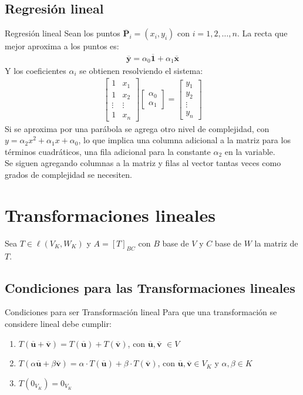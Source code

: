 \documentclass[a4paper, twoside]{article}
\numberwithin{equation}{section}
\numberwithin{figure}{section}
\numberwithin{table}{section}
\newcommand{\vect}[1]{\overline{\textbf{#1}}}
\begin{document}
\subsection{Regresión lineal}
\begin{definicion*}{Regresión lineal}
	Sean los puntos $\vect{P}_i=(x_i,y_i)$ con $i=1,2,\ldots,n$. La recta que mejor aproxima a los puntos es:
	\begin{align}
		\vect{y}=\alpha_0\vect{1}+\alpha_1 \vect{x}
	\end{align}
	Y los coeficientes $\alpha_i$ se obtienen resolviendo el sistema:
	\begin{align}
		\begin{bmatrix}
			{1} & {x_1} \\
			{1} & {x_2} \\
			{\vdots} & {\vdots} \\
			{1} & {x_n}
		\end{bmatrix}
		\begin{bmatrix}
			{\alpha_0} \\
			{\alpha_1}
		\end{bmatrix} =
		\begin{bmatrix}
			{y_1} \\
			{y_2} \\
			{\vdots} \\
			{y_n}
		\end{bmatrix}
	\end{align}
	Si se aproxima por una parábola se agrega otro nivel de complejidad, con $y=\alpha_2x^2+\alpha_1x+\alpha_0$, lo que implica una columna adicional a la matriz para los términos cuadráticos, una fila adicional para la constante $\alpha_2$ en la variable.\\
	
	Se siguen agregando columnas a la matriz y filas al vector tantas veces como grados de complejidad se necesiten.
\end{definicion*}

\newpage
\section{Transformaciones lineales}
Sea $T \in \ell (V_K,W_K)$ y $A=[T]_{BC}$ con $B$ base de $V$ y $C$ base de $W$ la matriz de $T$.

\subsection{Condiciones para las Transformaciones lineales}
\begin{definicion*}{Condiciones para ser Transformación lineal}
	Para que una transformación se considere lineal debe cumplir:
	\begin{enumerate}
		\item $T(\vect{u}+\vect{v})=T(\vect{u})+T(\vect{v})$, con $\vect{u},\vect{v}$ $\in V$
		\item $T(\alpha \vect{u}+\beta \vect{v})=\alpha \cdot T(\vect{u})+\beta \cdot T(\vect{v})$, con $\vect{u},\vect{v} \in V_K$ y $\alpha,\beta \in K$
		\item $T(0_{V_K})=0_{V_K}$
	\end{enumerate}
\end{definicion*}
\end{document}
